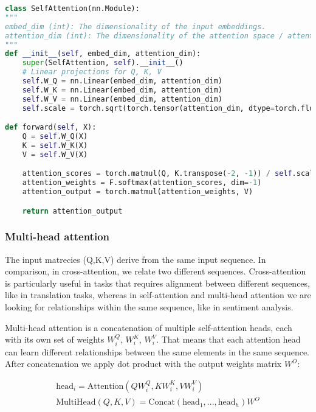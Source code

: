 \begin{lstlisting}[language=Python, breaklines=true, caption={Full implementation of a single self-attention block.}]
class SelfAttention(nn.Module):
"""
embed_dim (int): The dimensionality of the input embeddings.
attention_dim (int): The dimensionality of the attention space / attention vectors (Q, K, V).
"""
def __init__(self, embed_dim, attention_dim):
    super(SelfAttention, self).__init__()
    # Linear projections for Q, K, V
    self.W_Q = nn.Linear(embed_dim, attention_dim)
    self.W_K = nn.Linear(embed_dim, attention_dim)
    self.W_V = nn.Linear(embed_dim, attention_dim)
    self.scale = torch.sqrt(torch.tensor(attention_dim, dtype=torch.float32))

def forward(self, X):
    Q = self.W_Q(X)
    K = self.W_K(X)
    V = self.W_V(X)

    attention_scores = torch.matmul(Q, K.transpose(-2, -1)) / self.scale
    attention_weights = F.softmax(attention_scores, dim=-1)
    attention_output = torch.matmul(attention_weights, V)

    return attention_output
\end{lstlisting}








\subsubsection{Multi-head attention}

The input matrecies (Q,K,V) derive from the same input sequence. In comparison, in cross-attention, we relate two different sequences. Cross-attention is particularly useful in tasks that requires alignment between different sequences, like in translation tasks, whereas in self-attention and multi-head attention we are looking for relationships within the same sequence, like in sentiment analysis.

Multi-head attention is a concatenation of multiple self-attention heads, each with its own set of weights $W_i^Q$, $W_i^K$, $W_i^V$. That means that each attention head can learn different relationships between the same elements in the same sequence. After concatenation we apply dot product with the output weights matrix $W^O$:

\begin{equation}
    \begin{aligned}
        \text{head}_i = \text{Attention}(QW_i^Q, KW_i^K, VW_i^V)  \\
        \text{MultiHead}(Q, K, V) = \text{Concat}(\text{head}_1, ..., \text{head}_h)W^O
    \end{aligned}
\end{equation}










